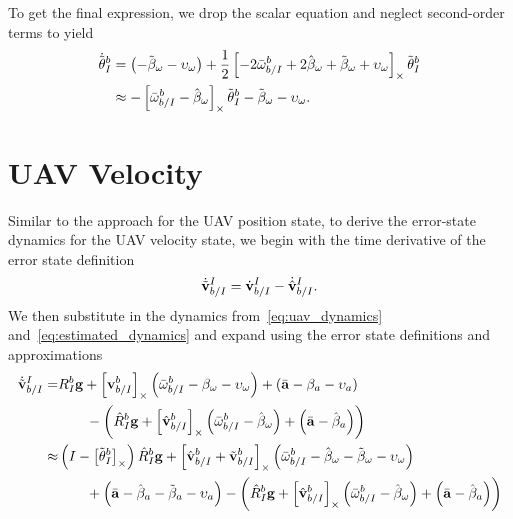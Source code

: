 To get the final expression, we drop the scalar equation and neglect
second-order terms to yield
\begin{align}
  \dot{\tilde{\mathrm{\mathbf{\theta}}}}_I^b
  &=
    \left( - \tilde{\mathrm{\mathbf{\beta}}}_\omega -
    \mathrm{\mathbf{\upsilon}}_\omega \right) 
    + \frac{1}{2}
    \left[  -2\bar{\mathrm{\mathbf{\omega}}}_{b/I}^b + 2\hat{\mathrm{\mathbf{\beta}}}_\omega
      + \tilde{\mathrm{\mathbf{\beta}}}_\omega + \mathrm{\mathbf{\upsilon}}_\omega  \right]_{\times}
    \tilde{\mathrm{\mathbf{\theta}}}_I^b \\
  &\approx
  -\left[  \bar{\mathrm{\mathbf{\omega}}}_{b/I}^b - \hat{\mathrm{\mathbf{\beta}}}_\omega \right]_{\times}
    \tilde{\mathrm{\mathbf{\theta}}}_I^b
    - \tilde{\mathrm{\mathbf{\beta}}}_\omega -
    \mathrm{\mathbf{\upsilon}}_\omega .
\end{align}

\section{UAV Velocity}
Similar to the approach for the UAV position state, to derive the error-state
dynamics for the UAV velocity state, we begin with the time derivative of the
error state definition
\begin{equation}
  \dot{\tilde{\mathrm{\mathbf{v}}}}_{b/I}^I = \dot{\mathrm{\mathbf{v}}}_{b/I}^I -
  \dot{\hat{\mathrm{\mathbf{v}}}}_{b/I}^I.
\end{equation}
We then substitute in the dynamics from~\eqref{eq:uav_dynamics}
and~\eqref{eq:estimated_dynamics} and expand using the error state definitions
and approximations
\begin{align}
  \dot{\tilde{\mathrm{\mathbf{v}}}}_{b/I}^I
  =&
  R_I^b \mathrm{\mathbf{g}}
  +
  \left[ \mathrm{\mathbf{v}}_{b/I}^b \right]_{\times}
  \left( \bar{\mathrm{\mathbf{\omega}}}_{b/I}^b - \mathrm{\mathbf{\beta}}_\omega -
  \mathrm{\mathbf{\upsilon}}_\omega \right)
  +
  \left( \bar{\mathrm{\mathbf{a}}} - \mathrm{\mathbf{\beta}}_a - \mathrm{\mathbf{\upsilon}}_a \right) \\
                                  & \qquad -
                                  \left( \hat{R}_I^b \mathrm{\mathbf{g}}
  +
  \left[ \hat{\mathrm{\mathbf{v}}}_{b/I}^b \right]_{\times}
  \left( \bar{\mathrm{\mathbf{\omega}}}_{b/I}^b - \hat{\mathrm{\mathbf{\beta}}}_\omega \right)
  +
\left( \bar{\mathrm{\mathbf{a}}} - \hat{\mathrm{\mathbf{\beta}}}_a \right) \right) \nonumber \\
  \approx&
  \left( I - \left[ \tilde{\mathrm{\mathbf{\theta}}}_I^b  \right]_{\times}\right) \hat{R}_I^b \mathrm{\mathbf{g}}
  +
  \left[  \hat{\mathrm{\mathbf{v}}}_{b/I}^b + \tilde{\mathrm{\mathbf{v}}}_{b/I}^b  \right]_{\times} 
  \left( \bar{\mathrm{\mathbf{\omega}}}_{b/I}^b - \hat{\mathrm{\mathbf{\beta}}}_\omega -
    \tilde{\mathrm{\mathbf{\beta}}}_\omega -
  \mathrm{\mathbf{\upsilon}}_\omega \right) \\
                                  & \qquad 
  + \left( \bar{\mathrm{\mathbf{a}}} - \hat{\mathrm{\mathbf{\beta}}}_a - \tilde{\mathrm{\mathbf{\beta}}}_a - \mathrm{\mathbf{\upsilon}}_a \right)
  - \left( \hat{R}_I^b \mathrm{\mathbf{g}}
  +
  \left[ \hat{\mathrm{\mathbf{v}}}_{b/I}^b \right]_{\times}
  \left( \bar{\mathrm{\mathbf{\omega}}}_{b/I}^b - \hat{\mathrm{\mathbf{\beta}}}_\omega \right)
  +
\left( \bar{\mathrm{\mathbf{a}}} - \hat{\mathrm{\mathbf{\beta}}}_a \right) \right) \nonumber
\end{align}
